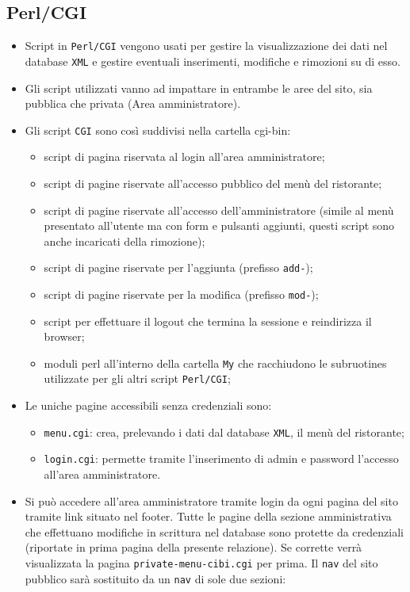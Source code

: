 \documentclass[../relazione.tex]{subfiles}
\begin{document}
	\subsection{Perl/CGI}
	\begin{itemize}
		\item Script in \texttt{Perl/CGI} vengono usati per gestire la visualizzazione dei dati nel database \texttt{XML} e gestire eventuali inserimenti, modifiche e rimozioni su di esso.
		\item Gli script utilizzati vanno ad impattare in entrambe le aree del sito, sia pubblica che privata (Area amministratore).
		\item Gli script \texttt{CGI} sono così suddivisi nella cartella cgi-bin:
			\begin{itemize}
				\item script di pagina riservata al login all'area amministratore;
				\item script di pagine riservate all'accesso pubblico del menù del ristorante;
				\item script di pagine riservate all'accesso dell'amministratore (simile al menù presentato all'utente ma con form e pulsanti aggiunti, questi script sono anche incaricati della rimozione);
				\item script di pagine riservate per l'aggiunta (prefisso \texttt{add-});
				\item script di pagine riservate per la modifica (prefisso \texttt{mod-});
				\item script per effettuare il logout che termina la sessione e reindirizza il browser;
				\item moduli perl all'interno della cartella \texttt{My} che racchiudono le subruotines utilizzate per gli altri script \texttt{Perl/CGI};
			\end{itemize}
		\item Le uniche pagine accessibili senza credenziali sono:
			\begin{itemize}
				\item \texttt{menu.cgi}: crea, prelevando i dati dal database \texttt{XML}, il menù del ristorante;
				\item \texttt{login.cgi}: permette tramite l'inserimento di admin e password l'accesso all'area amministratore.
			\end{itemize}
		\item Si può accedere all'area amministratore tramite login da ogni pagina del sito tramite link situato nel footer. Tutte le pagine della sezione amministrativa che effettuano modifiche in scrittura nel database sono protette da credenziali (riportate in prima pagina della presente relazione). Se corrette verrà visualizzata la pagina \texttt{private-menu-cibi.cgi} per prima. Il \texttt{nav} del sito pubblico sarà sostituito da un \texttt{nav} di sole due sezioni:

\end{itemize}
\end{document}
